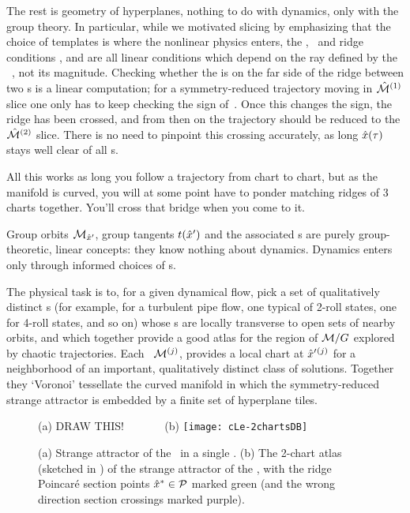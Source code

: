 The rest is geometry of hyperplanes, nothing to do with dynamics, only
with the group theory. In particular, while we motivated slicing by
emphasizing that the choice of templates is where the nonlinear physics
enters, the \slice, \chartBord\ and ridge conditions ,
 and  are all linear conditions which
depend on the ray defined by the \template\ \slicep, not its magnitude.
Checking whether the {\chartBord} is on the far side of the ridge between
two \slice s is a linear computation; for a symmetry-reduced trajectory
moving in $\hat{\cal M}{}^{(1)}$ slice one only has to keep checking the sign
of
\beq
{}
\,.
Once this changes the sign, the ridge has been crossed, and from then on
the trajectory should be reduced to the $\hat{\cal M}{}^{(2)}$ slice. There is
no need to pinpoint this crossing accurately, as long $\hat{x}(\tau)$
stays well clear of all \chartBord s.

All this works as long you follow a trajectory from chart to chart, but
as the manifold is curved, you will at some point have to ponder matching
ridges of 3 charts together. You'll cross that bridge when you come to
it.

Group orbits ${\cal M}_{{\hat{x}'}}$, group tangents $t({\hat{x}'})$ and the
associated \slice s are purely group-theoretic, linear concepts: they
know nothing about dynamics. Dynamics enters only through informed
choices of \template s.

The physical task is to, for a given dynamical flow, pick a set of
qualitatively distinct {\template s} (for example, for a turbulent pipe
flow, one typical of 2-roll states, one for 4-roll states, and so on)
whose \slice s  are locally transverse to open sets of nearby orbits, and
which together provide a good atlas for the region of ${\cal M}/G$
explored by chaotic trajectories. Each \slice\ ${\cal M}{}^{(j)}$, provides a
local chart at ${\hat{x}'}{}^{(j)}$ for a neighborhood of an important,
qualitatively distinct class of solutions. Together they `Voronoi'
tessellate  the curved manifold in which the symmetry-reduced strange
attractor is embedded by a finite set of hyperplane tiles.

\begin{figure}
 \begin{center}
(a) DRAW THIS! %
~~~~~~
(b) \texttt{[image: cLe-2chartsDB]}
 \end{center}
  \caption{\label{fig:cLe-2charts}
(a)
Strange attractor of the \cLe\ in a single \slice.
(b)
The 2-chart atlas (sketched in ) of the strange
attractor of the \cLe, with the ridge Poincar\'e section points
$\hat{x}^* \in {\cal P}$ marked green (and the wrong direction section
crossings marked purple).
  }
\end{figure}


